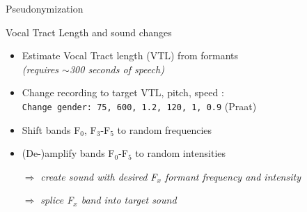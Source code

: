 \documentclass[xcolor={dvipsnames}]{beamer}
\begin{document}
\begin{frame}{Pseudonymization}

    \begin{figure}[htb]
        \centering
    \end{figure}

\end{frame}

\begin{frame}{Vocal Tract Length and sound changes}

\begin{itemize}
    \item Estimate Vocal Tract length (VTL) from formants \cite{lammert_short-time_2015}\\
          \textit{(requires $\sim$300 seconds of speech)}
    \item Change recording to target VTL, pitch, speed \cite{boersma_praat:_2017}: \\
            {\texttt{Change gender: 75, 600, 1.2, 120, 1, 0.9}} \hfill (Praat)
    \item Shift bands F$_0$, F$_3$-F$_5$ to random frequencies
    \item (De-)amplify bands F$_0$-F$_5$ to random intensities
    \item[$\Rightarrow$] \textit{create sound with desired F$_x$ formant frequency and intensity}
    \item[$\Rightarrow$] \textit{splice F$_x$ band into target sound}
\end{itemize}

\let\thefootnote\relax{}
\end{frame}
\end{document}
